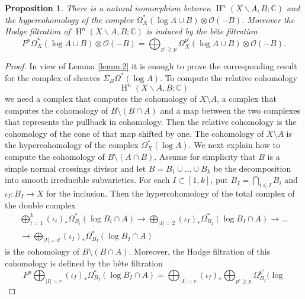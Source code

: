 \documentclass[11pt,a4paper]{amsart}
\newcommand{\C}{\mathds{C}}
\newcommand{\caO}{\mathcal{O}}
\DeclareMathOperator{\rH}{H}
\numberwithin{equation}{section}
\theoremstyle{plain}
\newtheorem{prop}{Proposition}[section]
\theoremstyle{definition}
\begin{document}
\begin{prop}
  There is a natural isomorphism between $\rH^{n}(X\smallsetminus
  A,B;\C)$ and the hypercohomology of the complex $\Omega ^{\ast}_{X}(\log
  A\cup B)\otimes \caO(-B)$. Moreover the Hodge filtration of
  $\rH^{n}(X\smallsetminus
  A,B;\C)$ is induced by the b\^ete filtration
  \begin{displaymath}
    F^{p}\Omega ^{\ast}_{X}(\log A\cup B)\otimes \caO(-B) =
    \bigoplus _{p'\ge p} \Omega ^{p'}_{X}(\log A\cup B)\otimes \caO(-B).
  \end{displaymath}
\end{prop}
\begin{proof}
  In view of Lemma \ref{lemm:2} it is enough to prove the
  corresponding result for the complex of sheaves $\Sigma _B\Omega
  ^{\ast}(\log A)$. To compute the relative cohomology  $$\rH^{n}(X\smallsetminus
  A,B;\C)$$ we need a complex that computes the cohomology of
  $X\setminus A$, a complex that computes the cohomology of
  $B\setminus (B\cap A)$ and a map between the two complexes that
  represents the pullback in cohomology. Then the relative cohomology
  is the cohomology of the cone of that map shifted by one. The
  cohomology of $X\setminus A$ is the hypercohomology of the complex
  $\Omega ^{\ast}_{X}(\log A)$. We next explain how to compute the
  cohomology of $B\setminus (A\cap 
  B)$.
  Assume for simplicity that $B$ is a simple
  normal crossings divisor and let $B=B_{1}\cup\dots\cup B_{k}$ be the
  decomposition into smooth irreducible subvarieties. For each
  $I\subset [1,k]$, put $B_{I}=\bigcap_{i\in I}B_{i}$ and
  $\iota_{I}\colon B_{I}\to X$ for the inclusion. Then the
  hypercohomology of the total complex of the double complex 
  \begin{multline*}
    \bigoplus _{i=1}^{k}
    (\iota_{i})_{\ast}\Omega^{\ast}_{B_{i}}(\log B_{i}\cap A)
    \longrightarrow
\bigoplus _{|I|=2}
    (\iota_{I})_{\ast}\Omega^{\ast}_{B_{I}}(\log B_{I}\cap A)
    \longrightarrow
    \dots \\
    \longrightarrow
    \bigoplus _{|I|=d}
    (\iota_{I})_{\ast}\Omega^{\ast}_{B_{I}}(\log B_{I}\cap A)
  \end{multline*}
  is the cohomology of $B\setminus (B\cap A)$. Moreover, the Hodge
  filtration of this cohomology is defined by the b\^ete filtration
  \begin{displaymath}
    F^{p} \bigoplus _{|I|=r}
    (\iota_{I})_{\ast}\Omega^{\ast}_{B_{I}}(\log B_{I}\cap A)=
    \bigoplus _{|I|=r}
    (\iota_{I})_{\ast}\bigoplus _{p'\ge p}\Omega^{p'}_{B_{I}}(\log

\end{displaymath}
\end{proof}
\end{document}

